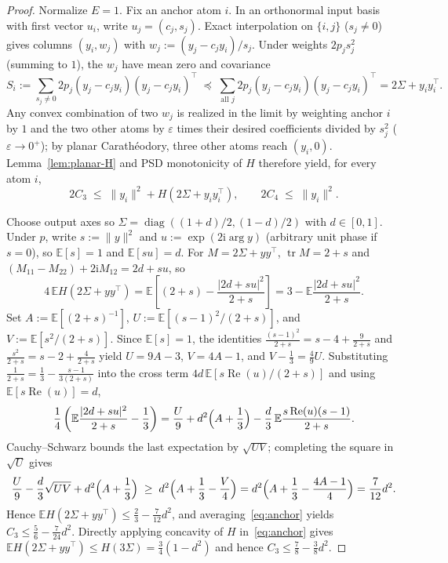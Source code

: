 \documentclass[11pt]{article}
\theoremstyle{plain}
\theoremstyle{definition}
\theoremstyle{remark}
\DeclareMathOperator{\tr}{tr}
\DeclareMathOperator{\diag}{diag}
\begin{document}
\begin{proof}
Normalize $E = 1$. Fix an anchor atom $i$. In an orthonormal input basis with first vector $u_i$, write $u_j = (c_j, s_j)$.
Exact interpolation on $\{i, j\}$ ($s_j \neq 0$) gives columns $(y_i, w_j)$ with $w_j := (y_j - c_j y_i)/s_j$.
Under weights $2p_j s_j^2$ (summing to $1$), the $w_j$ have mean zero and covariance
\[
S_i := \sum_{s_j \neq 0} 2p_j(y_j - c_j y_i)(y_j - c_j y_i)^\top
\;\preceq\; \sum_{\text{all } j} 2p_j(y_j - c_j y_i)(y_j - c_j y_i)^\top
= 2\Sigma + y_i y_i^\top.
\]
Any convex combination of two $w_j$ is realized in the limit by weighting anchor $i$ by $1$ and the two other atoms by $\varepsilon$ times their desired coefficients divided by $s_j^2$ ($\varepsilon \to 0^+$); by planar Carath\'eodory, three other atoms reach $(y_i, 0)$.
Lemma~\ref{lem:planar-H} and PSD monotonicity of $H$ therefore yield, for every atom $i$,
\begin{equation}\label{eq:anchor}
2C_3 \;\le\; \|y_i\|^2 + H(2\Sigma + y_i y_i^\top), \qquad 2C_4 \;\le\; \|y_i\|^2.
\end{equation}

Choose output axes so $\Sigma = \diag((1+d)/2, (1-d)/2)$ with $d \in [0,1]$.
Under $p$, write $s := \|y\|^2$ and $u := \exp(2\mathrm{i}\arg y)$ (arbitrary unit phase if $s=0$), so $\mathbb{E}[s] = 1$ and $\mathbb{E}[su] = d$.
For $M = 2\Sigma + yy^\top$, $\tr M = 2 + s$ and $(M_{11} - M_{22}) + 2\mathrm{i}M_{12} = 2d + su$, so
\[
4\,\mathbb{E}H(2\Sigma + yy^\top) = \mathbb{E}\left[(2+s) - \frac{|2d + su|^2}{2+s}\right] = 3 - \mathbb{E}\frac{|2d + su|^2}{2+s}.
\]
Set $A := \mathbb{E}[(2+s)^{-1}]$, $U := \mathbb{E}[(s-1)^2/(2+s)]$, and $V := \mathbb{E}[s^2/(2+s)]$.
Since $\mathbb{E}[s] = 1$, the identities $\frac{(s-1)^2}{2+s} = s - 4 + \frac{9}{2+s}$ and $\frac{s^2}{2+s} = s - 2 + \frac{4}{2+s}$ yield $U = 9A - 3$, $V = 4A - 1$, and $V - \frac{1}{3} = \frac{4}{9}U$.
Substituting $\frac{1}{2+s} = \frac{1}{3} - \frac{s-1}{3(2+s)}$ into the cross term $4d\,\mathbb{E}[s\operatorname{Re}(u)/(2+s)]$ and using $\mathbb{E}[s\operatorname{Re}(u)] = d$,
\[
\frac{1}{4}\left(\mathbb{E}\frac{|2d+su|^2}{2+s} - \frac{1}{3}\right)
= \frac{U}{9} + d^2\Bigl(A + \frac{1}{3}\Bigr) - \frac{d}{3}\,\mathbb{E}\frac{s\operatorname{Re}(u)(s-1)}{2+s}.
\]
Cauchy--Schwarz bounds the last expectation by $\sqrt{UV}$; completing the square in $\sqrt{U}$ gives
\[
\frac{U}{9} - \frac{d}{3}\sqrt{UV} + d^2\Bigl(A + \frac{1}{3}\Bigr)
\;\ge\; d^2\Bigl(A + \frac{1}{3} - \frac{V}{4}\Bigr)
= d^2\Bigl(A + \frac{1}{3} - \frac{4A - 1}{4}\Bigr) = \frac{7}{12}d^2.
\]
Hence $\mathbb{E}H(2\Sigma + yy^\top) \le \frac{2}{3} - \frac{7}{12}d^2$, and averaging~\eqref{eq:anchor} yields $C_3 \le \frac{5}{6} - \frac{7}{24}d^2$.
Directly applying concavity of $H$ in~\eqref{eq:anchor} gives $\mathbb{E}H(2\Sigma + yy^\top) \le H(3\Sigma) = \frac{3}{4}(1 - d^2)$ and hence $C_3 \le \frac{7}{8} - \frac{3}{8}d^2$.
\end{proof}
\end{document}
